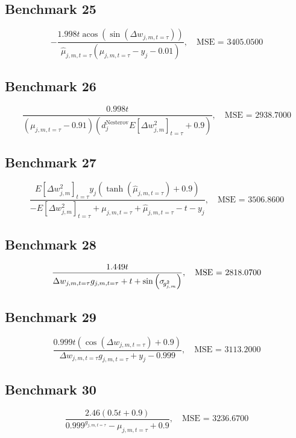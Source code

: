 \subsection*{Benchmark 25}
\begin{equation}
\label{eq:benchmark-25}
- \frac{1.998 t \operatorname{acos}{\left(\sin{\left(\Delta w_{j, m, t=\tau} \right)} \right)}}{\widehat{\mu}_{j,m,t=\tau} \left(\mu_{j,m,t=\tau} - y_{j} - 0.01\right)}, \quad \text{MSE = } 3405.0500
\end{equation}


\subsection*{Benchmark 26}
\begin{equation}
\label{eq:benchmark-26}
\frac{0.998 t}{\left(\mu_{j,m,t=\tau} - 0.91\right) \left(d_{j}^{\mathrm{Nesterov}} E\left[\Delta w_{j, m}^2\right]_{t=\tau} + 0.9\right)}, \quad \text{MSE = } 2938.7000
\end{equation}


\subsection*{Benchmark 27}
\begin{equation}
\label{eq:benchmark-27}
\frac{E\left[\Delta w_{j, m}^2\right]_{t=\tau} y_{j} \left(\tanh{\left(\widehat{\mu}_{j,m,t=\tau} \right)} + 0.9\right)}{- E\left[\Delta w_{j, m}^2\right]_{t=\tau} + \mu_{j,m,t=\tau} + \widehat{\mu}_{j,m,t=\tau} - t - y_{j}}, \quad \text{MSE = } 3506.8600
\end{equation}


\subsection*{Benchmark 28}
\begin{equation}
\label{eq:benchmark-28}
\frac{1.449 t}{\Delta w_{j, m, t=\tau} g_{j, m, t=\tau} + t + \sin{\left(\sigma_{\hspace{-.05cm}g^{2}_{j,m}} \right)}}, \quad \text{MSE = } 2818.0700
\end{equation}


\subsection*{Benchmark 29}
\begin{equation}
\label{eq:benchmark-29}
\frac{0.999 t \left(\cos{\left(\Delta w_{j, m, t=\tau} \right)} + 0.9\right)}{\Delta w_{j, m, t=\tau} g_{j, m, t=\tau} + y_{j} - 0.999}, \quad \text{MSE = } 3113.2000
\end{equation}


\subsection*{Benchmark 30}
\begin{equation}
\label{eq:benchmark-30}
\frac{2.46 \left(0.5 t + 0.9\right)}{{0.999}^{g_{j, m, t=\tau}} - \mu_{j,m,t=\tau} + 0.9}, \quad \text{MSE = } 3236.6700
\end{equation}
